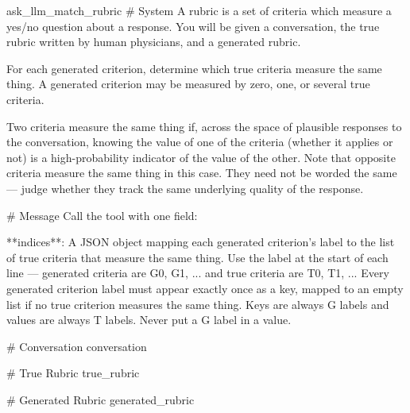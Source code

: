 \label{prompt:ask_llm_match_rubric}
\begin{textbox}{ask\_llm\_match\_rubric}
# System
A rubric is a set of criteria which measure a yes/no question about a response. You will be given a conversation, the true rubric written by human physicians, and a generated rubric.

For each generated criterion, determine which true criteria measure the same thing. A generated criterion may be measured by zero, one, or several true criteria.

Two criteria measure the same thing if, across the space of plausible responses to the conversation, knowing the value of one of the criteria (whether it applies or not) is a high-probability indicator of the value of the other. Note that opposite criteria measure the same thing in this case. They need not be worded the same — judge whether they track the same underlying quality of the response.

# Message
Call the tool with one field:

**indices**: A JSON object mapping each generated criterion's label to the list of true criteria that measure the same thing. Use the label at the start of each line — generated criteria are G0, G1, ... and true criteria are T0, T1, ... Every generated criterion label must appear exactly once as a key, mapped to an empty list if no true criterion measures the same thing. Keys are always G labels and values are always T labels. Never put a G label in a value.

# Conversation
{conversation}

# True Rubric
{true_rubric}

# Generated Rubric
{generated_rubric}
\end{textbox}
